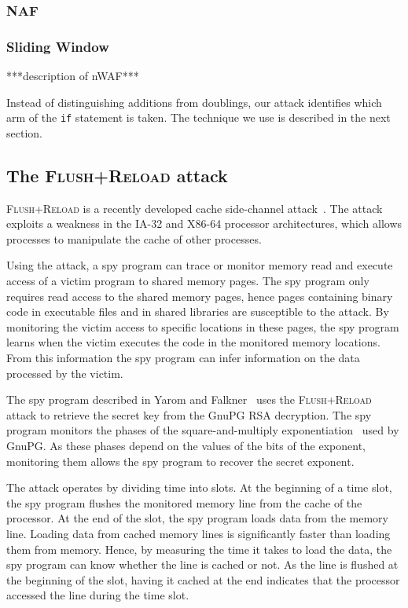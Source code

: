 \documentclass[twocolumn]{article}
\newcommand{\fl}{\textsc{Flu\-sh+\allowbreak Re\-load}\xspace}
\begin{document}
\subsubsection{NAF}

\subsubsection{Sliding Window}





***description of nWAF***


Instead of distinguishing additions from doublings, our attack identifies which arm of the \texttt{if} statement is taken.
The technique we use is described in the next section.



\subsection{The \fl attack}
\fl is a recently developed cache side-channel attack~\cite{yarom13flush}.
The attack exploits a weakness in the IA-32 and X86-64 processor architectures, which allows
processes to manipulate the cache of other processes.

Using the attack, a spy program can trace or monitor memory read and execute access of a victim program to shared memory pages.
The spy program only requires read access to the shared memory pages, hence pages containing binary code in executable files and
in shared libraries are susceptible to the attack.
By monitoring the victim access to specific locations in these pages, the spy program learns when the victim
executes the code in the monitored memory locations.
From this information the spy program can infer information on the data processed by the victim.

The spy program described in Yarom and Falkner~\cite{yarom13flush} uses the \fl attack to retrieve
the secret key from the GnuPG RSA decryption.
The spy program monitors the phases of the square-and-multiply exponentiation~\cite{gordon98survey} used by GnuPG.  
As these phases depend on the values of the bits of the exponent, monitoring them
allows the spy program to recover the secret exponent.

The attack operates by dividing time into slots.  
At the beginning of a time slot, the spy program flushes the monitored memory line from the cache of the processor.
At the end of the slot, the spy program loads data from the memory line.
Loading data from cached memory lines is significantly faster than loading them from memory.
Hence, by measuring the time it takes to load the data, the spy program can know whether the line is cached or not.
As the line is flushed at the beginning of the slot, having it cached at the end indicates that the processor accessed
the line during the time slot.
\end{document}
